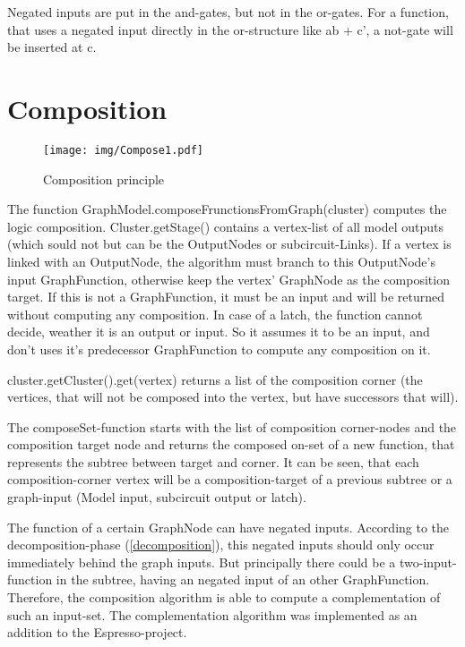 \documentclass[colorback,accentcolor=tud1c,11pt]{tudreport}
\begin{document}
Negated inputs are put in the and-gates, but not in the or-gates. For a function, that uses a negated input directly in the or-structure like ab + c', a not-gate will be inserted at c.







\chapter{Composition}
\label{composition}
\begin{wrapfigure}{r}{0.41\textwidth}
\centering
\texttt{[image: img/Compose1.pdf]}\\
\caption{Composition principle}
\label{fig:compose1}
\end{wrapfigure}
The function GraphModel.composeFrunctionsFromGraph(cluster) computes the logic composition. Cluster.getStage() contains a vertex-list of all model outputs (which sould not but can be the OutputNodes or subcircuit-Links). If a vertex is linked with an OutputNode, the algorithm must branch to this OutputNode's input GraphFunction, otherwise keep the vertex' GraphNode as the composition target. If this is not a GraphFunction, it must be an input and will be returned without computing any composition. In case of a latch, the function cannot decide, weather it is an output or input. So it assumes it to be an input, and don't uses it's predecessor GraphFunction to compute any composition on it.

cluster.getCluster().get(vertex) returns a list of the composition corner (the vertices, that will not be composed into the vertex, but have successors that will).

The composeSet-function starts with the list of composition corner-nodes and the composition target node and returns the composed on-set of a new function, that represents the subtree between target and corner. It can be seen, that each composition-corner vertex will be a composition-target of a previous subtree or a graph-input (Model input, subcircuit output or latch).

The function of a certain GraphNode can have negated inputs. According to the decomposition-phase (\ref{decomposition}), this negated inputs should only occur immediately behind the graph inputs. But principally there could be a two-input-function in the subtree, having an negated input of an other GraphFunction. Therefore, the composition algorithm is able to compute a complementation of such an input-set. The complementation algorithm was implemented as an addition to the Espresso-project.
\end{document}
